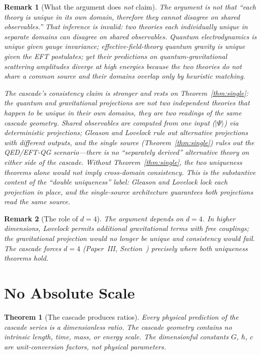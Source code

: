 \documentclass[12pt,a4paper]{article}
\newtheorem{theorem}{Theorem}[section]
\newtheorem*{remark}{Remark}
\begin{document}
\begin{remark}[What the argument does \emph{not} claim]\label{rem:sp26-status}
The argument is \emph{not} that ``each theory is unique in its own
domain, therefore they cannot disagree on shared observables.'' That
inference is invalid: two theories each individually unique in
separate domains can disagree on shared observables. Quantum
electrodynamics is unique given gauge invariance; effective-field-theory
quantum gravity is unique given the EFT postulates; yet their
predictions on quantum-gravitational scattering amplitudes diverge at
high energies because the two theories do not share a common source and
their domains overlap only by heuristic matching.

The cascade's consistency claim is stronger and rests on
Theorem~\ref{thm:single}: the quantum and gravitational projections are
not two independent theories that happen to be unique in their own
domains, they are two readings of the same cascade geometry. Shared
observables are computed from one input ($|\Psi\rangle$) via
deterministic projections; Gleason and Lovelock rule out alternative
projections with different outputs, and the single source
(Theorem~\ref{thm:single}) rules out the QED/EFT-QG scenario---there
is no ``separately derived'' alternative theory on either side of the
cascade. Without Theorem~\ref{thm:single}, the two uniqueness theorems
alone would not imply cross-domain consistency. This is the substantive
content of the ``double uniqueness'' label: Gleason and Lovelock lock
each projection in place, and the single-source architecture guarantees
both projections read the same source.
\end{remark}

\begin{remark}[The role of $d = 4$]
The argument depends on $d = 4$. In higher dimensions, Lovelock permits
additional gravitational terms with free couplings; the gravitational
projection would no longer be unique and consistency would fail. The
cascade forces $d = 4$ (Paper~III, Section~) precisely where both
uniqueness theorems hold.
\end{remark}

\section{No Absolute Scale}

\begin{theorem}[The cascade produces ratios]\label{thm:noscale}
Every physical prediction of the cascade series is a dimensionless ratio.
The cascade geometry contains no intrinsic length, time, mass, or energy
scale. The dimensionful constants $G$, $\hbar$, $c$ are unit-conversion
factors, not physical parameters.
\end{theorem}
\end{document}
